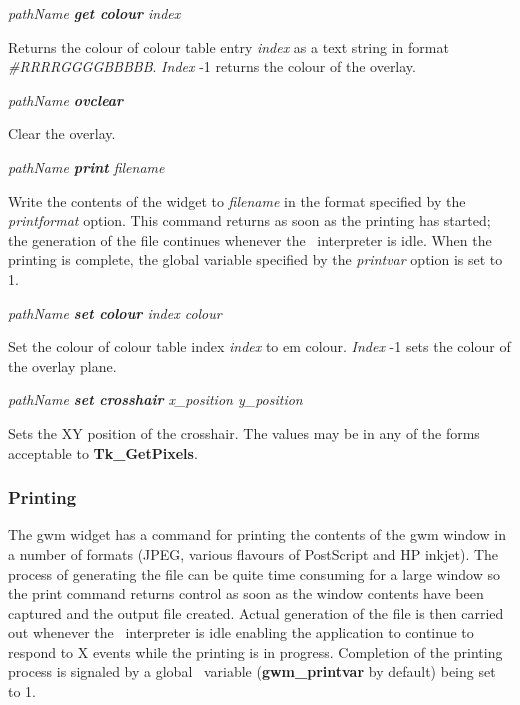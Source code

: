 {\em pathName {\bf get colour} index}
\begin{rquote}
Returns the colour of colour table entry {\em index} as a text string in 
format \hbox{\em \#RRRRGGGGBBBBB}. {\em Index} -1 returns the 
colour of the overlay. 
\end{rquote}

{\em pathName {\bf ovclear}}
\begin{rquote}
Clear the overlay.
\end{rquote}

{\em pathName {\bf print} filename}
\begin{rquote}
Write the contents of the widget to {\em filename} in the format specified
by the {\em printformat} option. This command returns as soon as the printing
has started; the generation of the file continues whenever the \Tcl\ interpreter
is idle. When the printing is complete, the global variable specified by the
{\em printvar} option is set to 1.
\end{rquote}

{\em pathName {\bf set colour} index colour}
\begin{rquote}
Set the colour of colour table index {\em index} to {em colour}. {\em Index}
-1 sets the colour of the overlay plane.
\end{rquote}

{\em pathName {\bf set crosshair} x\_position y\_position}
\begin{rquote}
Sets the XY position of the crosshair.
The values may be in any of the forms acceptable to {\bf Tk\_GetPixels}.
\end{rquote}

\subsubsection{Printing}

The gwm widget has a command for printing the contents of the gwm window in
a number of formats (JPEG, various flavours of PostScript and HP inkjet).
The process of generating the file can be quite time consuming for a large
window so the print command returns control as soon as the window contents
have been captured and the output file created. Actual generation of the
file is then carried out whenever the \Tcl\ interpreter is idle enabling the
application to continue to respond to X events while the printing is in
progress.
Completion of the printing process is signaled by a global \Tcl\ variable
({\bf gwm\_printvar} by default) being set to 1. 

